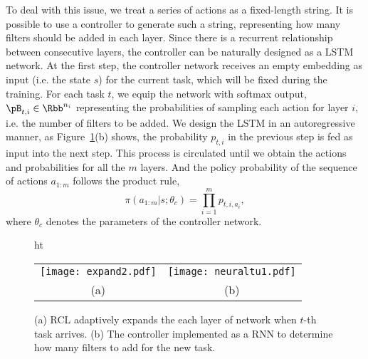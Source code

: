 \documentclass{article}
\begin{document}
To deal with this issue, we treat a series of actions as a fixed-length string. It is possible to use a controller to generate such a string, representing how many filters should be added in each layer.
Since there is a recurrent relationship between consecutive layers, the controller can be naturally  designed  as a LSTM network.  At the first step, the controller
network receives an empty embedding as input (i.e. the state $s$) for the current task, which will be fixed during the training.
For each task $t$, we equip the network with softmax output, $\pB_{t,i} \in \Rbb^{n_i}$ representing the probabilities of sampling each action for layer $i$, i.e. the number of filters to be added.  We design the LSTM in an autoregressive manner,  as Figure~\ref{fig:rcl}(b) shows, the probability $p_{t,i}$ in the previous step is fed as input into the next step. This process is circulated until we obtain  the actions and probabilities for  all the $m$ layers. And the policy probability of the sequence of actions $a_{1:m}$ follows the product rule,
\begin{equation}
\pi(a_{1:m}|s;\theta_c) = \prod_{i=1}^{m} p_{t,i,a_i},
\end{equation}
 where $\theta_c$ denotes the parameters of the controller network.





\begin{figure}{ht}
		\centering
    \begin{tabular}{cc}
		\texttt{[image: expand2.pdf]} & \texttt{[image: neuraltu1.pdf]} \\
    (a) & (b)
    \end{tabular}
    \vspace{-0.3cm}
 		 \caption{(a) RCL adaptively expands the each layer of network when $t$-th task arrives. (b) The controller implemented as a RNN to determine how many filters to add for the new task.}
		\label{fig:rcl}
\end{figure}
\end{document}
